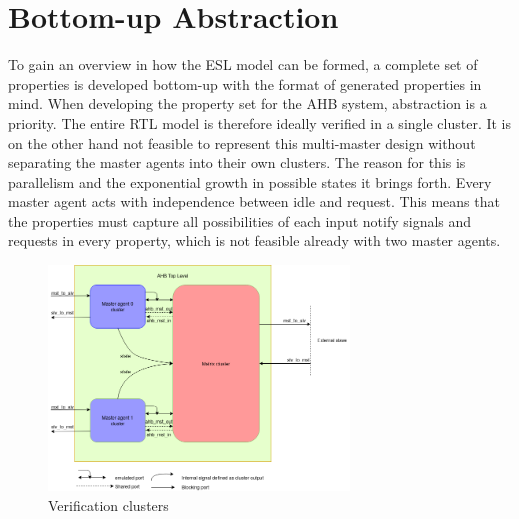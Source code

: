 \label{ch:design}

\section{Bottom-up Abstraction}
\label{sec:bottom-up}
To gain an overview in how the ESL model can be formed, a complete set of properties is developed bottom-up with the format of generated properties in mind.
When developing the property set for the AHB system, abstraction is a priority. The entire RTL model is therefore ideally verified in a single cluster. 
It is on the other hand not feasible to represent this multi-master design without separating the master agents into their own clusters. The reason for this is 
parallelism and the exponential growth in possible states it brings forth. Every master agent acts with independence between idle and request. This means that the properties must capture all possibilities of each input notify signals and requests in every property, which is not feasible already with two master agents. \\
\begin{figure}
\includegraphics[width=8cm]{figs/Verif/Verif_block.png}
\caption{Verification clusters}\label{fig:verif-clust}
\end{figure} 

